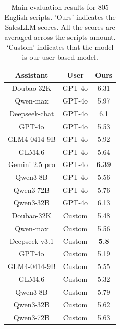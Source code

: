\begin{table}[t]
\centering
\small
\caption{Main evaluation results for 805 English scripts. 'Ours' indicates the SalesLLM scores. All the scores are averaged across the scripts amount. `Custom' indicates that the model is our user-based model.}
\label{tab:main_res_tab_en}
\begin{tabular}{ccc}
\toprule
\textbf{Assistant} & \textbf{User} & \textbf{Ours}\\
\midrule
Doubao-32K & GPT-4o & 6.31 \\
Qwen-max & GPT-4o& 5.97   \\
Deepseek-chat & GPT-4o& 6.1   \\
GPT-4o & GPT-4o& 5.53  \\
GLM4-0414-9B & GPT-4o& 5.92  \\
GLM4.6 & GPT-4o& 5.64  \\
Gemini 2.5 pro & GPT-4o& \textbf{6.39}  \\
Qwen3-8B & GPT-4o& 5.56  \\
Qwen3-72B & GPT-4o& 5.76  \\
Qwen3-32B & GPT-4o& 6.13 \\
\midrule
Doubao-32K & Custom & 5.48  \\
Qwen-max & Custom& 5.56   \\
Deepseek-v3.1 & Custom&  \textbf{5.8}   \\
GPT-4o & Custom& 5.19  \\
GLM4-0414-9B & Custom& 5.55 \\
GLM4.6 & Custom& 5.32 \\
Qwen3-8B & Custom& 5.79 \\
Qwen3-32B & Custom& 5.62 \\
Qwen3-72B & Custom& 5.63  \\


\bottomrule
\end{tabular}
\end{table}